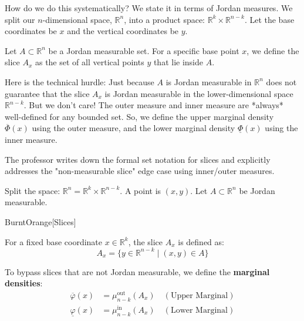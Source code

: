 \begin{spoken-clean}[00:42:00 - 00:46:30]
How do we do this systematically? We state it in terms of Jordan measures. We split our $n$-dimensional space, $\mathbb{R}^n$, into a product space: $\mathbb{R}^k \times \mathbb{R}^{n-k}$. Let the base coordinates be $x$ and the vertical coordinates be $y$. 

Let $A \subset \mathbb{R}^n$ be a Jordan measurable set. For a specific base point $x$, we define the slice $A_x$ as the set of all vertical points $y$ that lie inside $A$. 

Here is the technical hurdle: Just because $A$ is Jordan measurable in $\mathbb{R}^n$ does not guarantee that the slice $A_x$ is Jordan measurable in the lower-dimensional space $\mathbb{R}^{n-k}$. But we don't care! The outer measure and inner measure are *always* well-defined for any bounded set. So, we define the upper marginal density $\overline{\Phi}(x)$ using the outer measure, and the lower marginal density $\underline{\Phi}(x)$ using the inner measure.
\end{spoken-clean}

\begin{nice-box}
The professor writes down the formal set notation for slices and explicitly addresses the "non-measurable slice" edge case using inner/outer measures.
\end{nice-box}

\begin{math-stroke}
Split the space: $\mathbb{R}^n = \mathbb{R}^k \times \mathbb{R}^{n-k}$. A point is $(x,y)$.
Let $A \subset \mathbb{R}^n$ be Jordan measurable.
\end{math-stroke}

\begin{color-box}{BurntOrange}[Slices]
\begin{definition}[Slices]
For a fixed base coordinate $x \in \mathbb{R}^k$, the slice $A_x$ is defined as:
\[
A_x = \{ y \in \mathbb{R}^{n-k} \mid (x,y) \in A \}
\]
\end{definition}
\end{color-box}

\begin{math-stroke}
To bypass slices that are not Jordan measurable, we define the \textbf{marginal densities}:
\begin{align*}
\overline{\varphi}(x) &= \mu_{n-k}^{\text{out}}(A_x) \quad (\text{Upper Marginal}) \\
\underline{\varphi}(x) &= \mu_{n-k}^{\text{in}}(A_x) \quad (\text{Lower Marginal})
\end{align*}
\end{math-stroke}

